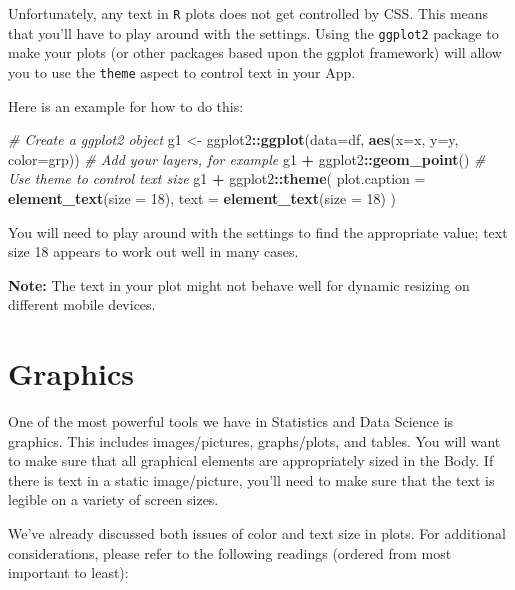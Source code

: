 \documentclass[
]{book}
\newenvironment{Shaded}{\begin{snugshade}}{\end{snugshade}}
\newcommand{\CommentTok}[1]{\textcolor[rgb]{0.56,0.35,0.01}{\textit{#1}}}
\newcommand{\DataTypeTok}[1]{\textcolor[rgb]{0.13,0.29,0.53}{#1}}
\newcommand{\DecValTok}[1]{\textcolor[rgb]{0.00,0.00,0.81}{#1}}
\newcommand{\KeywordTok}[1]{\textcolor[rgb]{0.13,0.29,0.53}{\textbf{#1}}}
\newcommand{\NormalTok}[1]{#1}
\newcommand{\OperatorTok}[1]{\textcolor[rgb]{0.81,0.36,0.00}{\textbf{#1}}}
\newcommand{\StringTok}[1]{\textcolor[rgb]{0.31,0.60,0.02}{#1}}
\begin{document}
Unfortunately, any text in \texttt{R} plots does not get controlled by CSS. This means that you'll have to play around with the settings. Using the \texttt{ggplot2} package to make your plots (or other packages based upon the ggplot framework) will allow you to use the \texttt{theme} aspect to control text in your App.

Here is an example for how to do this:

\begin{Shaded}
\begin{Highlighting}[]
\CommentTok{# Create a ggplot2 object}
\NormalTok{g1 <-}\StringTok{ }\NormalTok{ggplot2}\OperatorTok{::}\KeywordTok{ggplot}\NormalTok{(}\DataTypeTok{data=}\NormalTok{df, }\KeywordTok{aes}\NormalTok{(}\DataTypeTok{x=}\NormalTok{x, }\DataTypeTok{y=}\NormalTok{y, }\DataTypeTok{color=}\NormalTok{grp)) }
\CommentTok{# Add your layers, for example}
\NormalTok{g1 }\OperatorTok{+}\StringTok{ }\NormalTok{ggplot2}\OperatorTok{::}\KeywordTok{geom_point}\NormalTok{()}
\CommentTok{# Use theme to control text size}
\NormalTok{g1 }\OperatorTok{+}\StringTok{ }\NormalTok{ggplot2}\OperatorTok{::}\KeywordTok{theme}\NormalTok{(}
  \DataTypeTok{plot.caption =} \KeywordTok{element_text}\NormalTok{(}\DataTypeTok{size =} \DecValTok{18}\NormalTok{),}
  \DataTypeTok{text =} \KeywordTok{element_text}\NormalTok{(}\DataTypeTok{size =} \DecValTok{18}\NormalTok{)}
\NormalTok{  )}
\end{Highlighting}
\end{Shaded}

You will need to play around with the settings to find the appropriate value; text size 18 appears to work out well in many cases.

\textbf{Note:} The text in your plot might not behave well for dynamic resizing on different mobile devices.

\hypertarget{graphics}{%
\section{Graphics}\label{graphics}}

One of the most powerful tools we have in Statistics and Data Science is graphics. This includes images/pictures, graphs/plots, and tables. You will want to make sure that all graphical elements are appropriately sized in the Body. If there is text in a static image/picture, you'll need to make sure that the text is legible on a variety of screen sizes.

We've already discussed both issues of color and text size in plots. For additional considerations, please refer to the following readings (ordered from most important to least):
\end{document}
